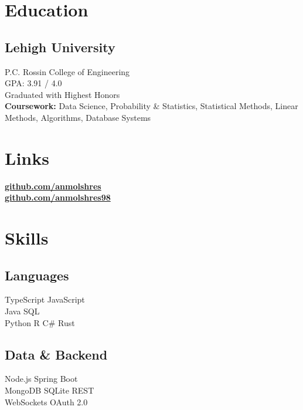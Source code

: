 \documentclass[]{deedy-resume-openfont}
\begin{document}
\lastupdated


\begin{minipage}[t]{0.30\textwidth}

\section{Education}
\subsection{Lehigh University}
P.C. Rossin College of Engineering \\
GPA: 3.91 / 4.0 \\
Graduated with Highest Honors \\
{\bf Coursework:} Data Science, Probability \& Statistics, Statistical Methods, Linear Methods, Algorithms, Database Systems
\sectionsep

\section{Links}
\href{https://github.com/anmolshres}{\bf github.com/anmolshres} \\
\href{https://github.com/anmolshres98}{\bf github.com/anmolshres98}
\sectionsep

\section{Skills}
\subsection{Languages}
TypeScript \textbullet{} JavaScript \\
Java \textbullet{} SQL \\
Python \textbullet{} R \textbullet{} C\# \textbullet{} Rust \\
\sectionsep
\subsection{Data \& Backend}
Node.js \textbullet{} Spring Boot \\
MongoDB \textbullet{} SQLite \textbullet{} REST \\
WebSockets \textbullet{} OAuth 2.0 \\
\sectionsep

\end{minipage}
\end{document}
